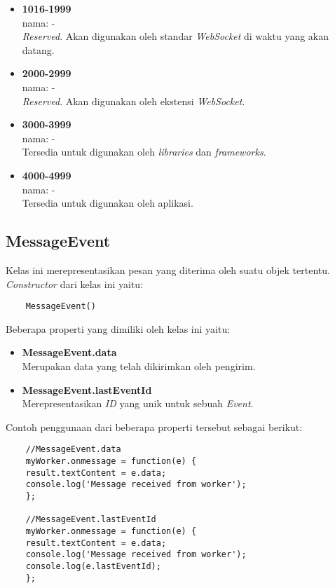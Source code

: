 \begin{itemize}
	\item \textbf{1016-1999} \\ nama: - \\ \textit{Reserved}. Akan digunakan oleh standar \textit{WebSocket} di waktu yang akan datang.
	
	\item \textbf{2000-2999} \\ nama: - \\ \textit{Reserved}. Akan digunakan oleh ekstensi \textit{WebSocket}.
	
	\item \textbf{3000-3999} \\ nama: - \\ Tersedia untuk digunakan oleh \textit{libraries} dan \textit{frameworks}.
	
	\item \textbf{4000-4999} \\ nama: - \\ Tersedia untuk digunakan oleh aplikasi.
\end{itemize}

\subsection{MessageEvent}
Kelas ini merepresentasikan pesan yang diterima oleh suatu objek tertentu. \textit{Constructor} dari kelas ini yaitu: 

\begin{lstlisting}
	MessageEvent()
\end{lstlisting}

Beberapa properti yang dimiliki oleh kelas ini yaitu: 

\begin{itemize}
	\item \textbf{MessageEvent.data} \\ Merupakan data yang telah dikirimkan oleh pengirim.
	\item \textbf{MessageEvent.lastEventId} \\ Merepresentasikan \textit{ID} yang unik untuk sebuah \textit{Event}.
\end{itemize}

Contoh penggunaan dari beberapa properti tersebut sebagai berikut:

\begin{lstlisting}
	//MessageEvent.data
	myWorker.onmessage = function(e) {
	result.textContent = e.data;
	console.log('Message received from worker');
	};
	
	//MessageEvent.lastEventId
	myWorker.onmessage = function(e) {
	result.textContent = e.data;
	console.log('Message received from worker');
	console.log(e.lastEventId);
	};
\end{lstlisting}


